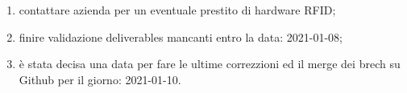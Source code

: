 \begin{enumerate}
    \item contattare azienda per un eventuale prestito di hardware RFID;
    \item finire validazione deliverables mancanti entro la data: 2021-01-08;
    \item è stata decisa una data per fare le ultime correzzioni ed il merge dei brech su Github per il giorno: 2021-01-10.
\end{enumerate}